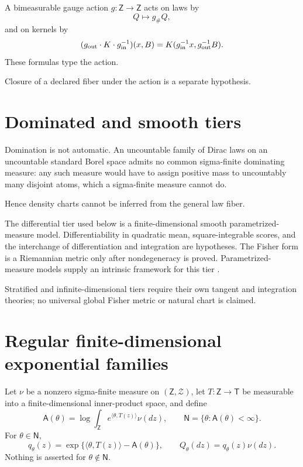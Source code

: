 A bimeasurable gauge action \(g:\mathsf Z\to\mathsf Z\) acts on laws by
\begin{equation}
Q\longmapsto g_\#Q ,
\label{eq:exp-general-pushforward}
\end{equation}
and on kernels by
\begin{equation}
(g_{\rm out}\cdot K\cdot g_{\rm in}^{-1})(x,B)
=K(g_{\rm in}^{-1}x,g_{\rm out}^{-1}B).
\label{eq:exp-kernel-action}
\end{equation}
These formulas type the action. 

Closure of a declared fiber under the action is a separate hypothesis.

\section{Dominated and smooth tiers}
\label{sec:exp-dominated-nondominated}

Domination is not automatic. An uncountable family of Dirac laws on an
uncountable standard Borel space admits no common sigma-finite dominating
measure: any such measure would have to assign positive mass to uncountably
many disjoint atoms, which a sigma-finite measure cannot do.

Hence density charts cannot be inferred from the general law fiber.

The differential tier used below is a finite-dimensional smooth
parametrized-measure model. Differentiability in quadratic mean,
square-integrable scores, and the interchange of differentiation and
integration are hypotheses. The Fisher form is a Riemannian metric only after
nondegeneracy is proved. Parametrized-measure models supply an intrinsic
framework for this tier \citep{AyJostLeSchwachhoefer2018}.

Stratified and infinite-dimensional tiers require their own tangent and
integration theories; no universal global Fisher metric or natural chart is
claimed.

\section{Regular finite-dimensional exponential families}
\label{sec:exp-family}

Let \(\nu\) be a nonzero sigma-finite measure on
\((\mathsf Z,\mathscr Z)\), let \(T:\mathsf Z\to\mathsf T\) be measurable
into a finite-dimensional inner-product space, and define
\begin{equation}
\mathsf A(\theta)
=\log\int_{\mathsf Z}e^{\langle\theta,T(z)\rangle}\nu(dz),
\qquad
\mathsf N=\{\theta:\mathsf A(\theta)<\infty\}.
\label{eq:exp-logpartition}
\end{equation}
For \(\theta\in\mathsf N\),
\begin{equation}
q_\theta(z)
=\exp\{\langle\theta,T(z)\rangle-\mathsf A(\theta)\},
\qquad
Q_\theta(dz)=q_\theta(z)\nu(dz).
\label{eq:exp-density}
\end{equation}
Nothing is asserted for \(\theta\notin\mathsf N\). 


